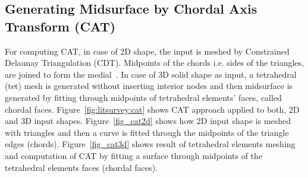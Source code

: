 

\subsection{Generating Midsurface by Chordal  Axis Transform (CAT)}	


For computing CAT, in case of 2D shape, the input is meshed by Constrained Delaunay Triangulation (CDT). Midpoints of the chords i.e. sides of the triangles, are joined to form the medial~\cite{QuadrosRoshanOwenBrewerShimada2004}. In case of 3D solid shape as input, a tetrahedral (tet) mesh is generated without inserting interior nodes and then midsurface is generated by fitting through midpoints of tetrahedral elements' faces, called chordal faces. Figure~\ref{fig:litsurvey:cat} shows CAT approach applied to both, 2D and 3D input shapes. Figure~\ref{fig_cat2d} shows how 2D input  shape is meshed with triangles and then a curve is fitted through the midpoints of the triangle edges (chords). Figure~\ref{fig_cat3d} shows result of tetrahedral elements meshing and computation of CAT by fitting a surface through midpoints of the tetrahedral elements faces (chordal faces).


